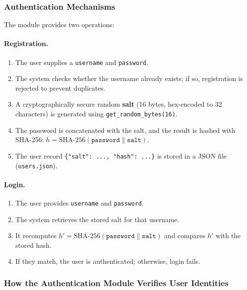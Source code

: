 \documentclass[12pt,a4paper]{article}
\begin{document}
\subsubsection{Authentication Mechanisms}

The module provides two operations:

\paragraph{Registration.}
\begin{enumerate}
    \item The user supplies a \texttt{username} and \texttt{password}.
    \item The system checks whether the username already exists; if so, registration is rejected to prevent duplicates.
    \item A cryptographically secure random \textbf{salt} (16 bytes, hex-encoded to 32 characters) is generated using \texttt{get\_random\_bytes(16)}.
    \item The password is concatenated with the salt, and the result is hashed with SHA-256: $h = \text{SHA-256}(\texttt{password} \| \texttt{salt})$.
    \item The user record \texttt{\{"salt": ..., "hash": ...\}} is stored in a JSON file (\texttt{users.json}).
\end{enumerate}

\paragraph{Login.}
\begin{enumerate}
    \item The user provides \texttt{username} and \texttt{password}.
    \item The system retrieves the stored salt for that username.
    \item It recomputes $h' = \text{SHA-256}(\texttt{password} \| \texttt{salt})$ and compares $h'$ with the stored hash.
    \item If they match, the user is authenticated; otherwise, login fails.
\end{enumerate}

\subsubsection{How the Authentication Module Verifies User Identities}
\end{document}
